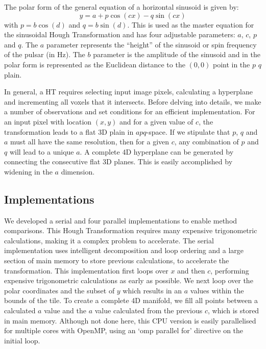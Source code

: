 The polar form of the general equation of a horizontal sinusoid is given by:
\begin{equation} \label{eq:masterPolar}
y = a + p \cos\left(cx\right) - q \sin \left( cx \right ) 
\end{equation}
with $ p = b \cos\left(d\right)$ and $ q =b \sin \left( d \right)$.
This is used as the master equation for the sinusoidal Hough Transformation and has four adjustable parameters: $a$, $c$, $p$ and $q$.
The $a$ parameter represents the ``height'' of the sinusoid or spin frequency of the pulsar (in Hz).  
The $b$ parameter is the amplitude of the sinusoid and in the polar form is represented as the Euclidean distance to the $(0,0)$ point in the $p$ $q$ plain.

In general, a HT requires selecting input image pixels, calculating a hyperplane and incrementing all voxels that it intersects.
Before delving into details, we make a number of observations and set conditions for an efficient implementation.
For an input pixel with location $(x, y)$ and for a given value of $c$, the transformation leads to a flat 3D plain in $apq$-space.
If we stipulate that $p$, $q$ and $a$ must all have the same resolution, then for a given $c$, any combination of $p$ and $q$ will lead to a unique $a$.
A complete 4D hyperplane can be generated by connecting the consecutive flat 3D planes.
This is easily accomplished by widening in the $a$ dimension.

\subsection{Implementations}

We developed a serial and four parallel implementations to enable method comparisons.
This Hough Transformation requires many expensive trigonometric calculations, making it a complex problem to accelerate.
The serial implementation uses intelligent decomposition and loop ordering and a large section of main memory to store previous calculations, to accelerate the transformation.
This implementation first loops over $x$ and then $c$, performing expensive trigonometric calculations as early as possible.
We next loop over the polar coordinates and the subset of $y$ which results in an $a$ values within the bounds of the tile.
To create a complete 4D manifold, we fill all points between a calculated $a$ value and the $a$ value calculated from the previous $c$, which is stored in main memory.
Although not done here, this CPU version is easily parallelised for multiple cores with OpenMP, using an `omp parallel for' directive on the initial loop.

